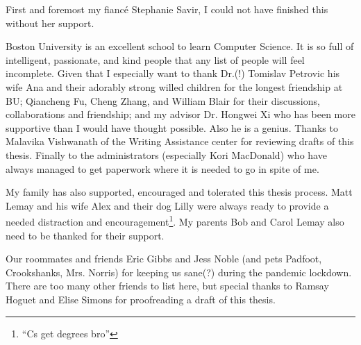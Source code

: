 First and foremost my fiancé Stephanie Savir, I could not have finished this without her support. %
 
Boston University is an excellent school to learn Computer Science.
It is so full of intelligent, passionate, and kind people that any list of people will feel incomplete.
Given that I especially want to thank Dr.(!) Tomislav Petrovic his wife Ana and their adorably strong willed children for the longest friendship at BU;
Qiancheng Fu, Cheng Zhang, and William Blair for their discussions, collaborations and friendship;
and my advisor Dr. Hongwei Xi who has been more supportive than I would have thought possible.
Also he is a genius.
Thanks to Malavika Vishwanath of the Writing Assistance center for reviewing drafts of this thesis.
Finally to the administrators (especially Kori MacDonald) who have always managed to get paperwork where it is needed to go in spite of me.

My family has also supported, encouraged and tolerated this thesis process.
Matt Lemay and his wife Alex and their dog Lilly were always ready to provide a needed distraction and encouragement\footnote{``Cs get degrees bro''}.
My parents Bob and Carol Lemay also need to be thanked for their support.

Our roommates and friends Eric Gibbs and Jess Noble (and pets Padfoot, Crookshanks, Mrs. Norris) for keeping us sane(?) during the pandemic lockdown.
There are too many other friends to list here, but special thanks to Ramsay Hoguet and Elise Simons for proofreading a draft of this thesis.


